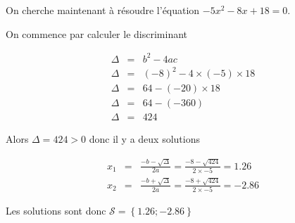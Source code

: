 \documentclass[a4paper,10pt]{article}
\begin{document}
    
    On cherche maintenant à résoudre l'équation $- 5 x^{  2 } - 8 x + 18 = 0$.
    
    On commence par calculer le discriminant
    
    \begin{eqnarray*}
        \Delta & = & b^2-4ac \\
        \Delta & = & ( -8 )^{  2 } - 4 \times ( -5 ) \times 18 \\ 
\Delta & = & 64 - ( -20 ) \times 18 \\ 
\Delta & = & 64 - ( -360 ) \\ 
\Delta & = & 424
    \end{eqnarray*}
    

    
    Alors $\Delta = 424 > 0$ donc il y a deux solutions

    
    

    \begin{eqnarray*}
        x_1 & = & \frac{-b - \sqrt{\Delta}}{2a} =  \frac{-8 - \sqrt{424}}{2 \times -5} = 1.26 \\
        x_2 & = & \frac{-b + \sqrt{\Delta}}{2a} =  \frac{-8 + \sqrt{424}}{2 \times -5} = -2.86
    \end{eqnarray*}

    Les solutions sont donc $\mathcal{S} = \left\{ 1.26; -2.86 \right\}$

    
\end{document}
